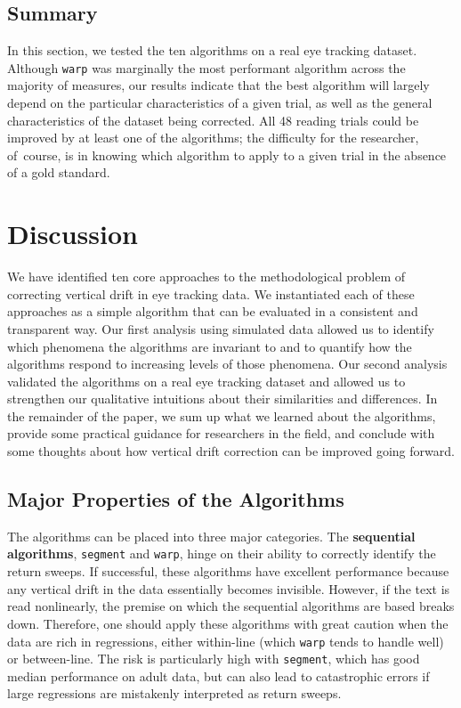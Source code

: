 \documentclass[doc,biblatex]{apa7}
\begin{document}
\subsection{Summary}

In this section, we tested the ten algorithms on a real eye tracking dataset. Although \texttt{warp} was marginally the most performant algorithm across the majority of measures, our results indicate that the best algorithm will largely depend on the particular characteristics of a given trial, as well as the general characteristics of the dataset being corrected. All 48 reading trials could be improved by at least one of the algorithms; the difficulty for the researcher, of~course, is in knowing which algorithm to apply to a given trial in the absence of a gold standard.

\section{Discussion}

We have identified ten core approaches to the methodological problem of correcting vertical drift in eye tracking data. We instantiated each of these approaches as a simple algorithm that can be evaluated in a consistent and transparent way. Our first analysis using simulated data allowed us to identify which phenomena the algorithms are invariant to and to quantify how the algorithms respond to increasing levels of those phenomena. Our second analysis validated the algorithms on a real eye tracking dataset and allowed us to strengthen our qualitative intuitions about their similarities and differences. In the remainder of the paper, we sum up what we learned about the algorithms, provide some practical guidance for researchers in the field, and conclude with some thoughts about how vertical drift correction can be improved going forward. 

\subsection{Major Properties of the Algorithms}

The algorithms can be placed into three major categories. The \textbf{sequential algorithms}, \texttt{segment} and \texttt{warp}, hinge on their ability to correctly identify the return sweeps. If successful, these algorithms have excellent performance because any vertical drift in the data essentially becomes invisible. However, if the text is read nonlinearly, the premise on which the sequential algorithms are based breaks down. Therefore, one should apply these algorithms with great caution when the data are rich in regressions, either within-line (which \texttt{warp} tends to handle well) or between-line. The risk is particularly high with \texttt{segment}, which has good median performance on adult data, but can also lead to catastrophic errors if large regressions are mistakenly interpreted as return sweeps.
\end{document}
